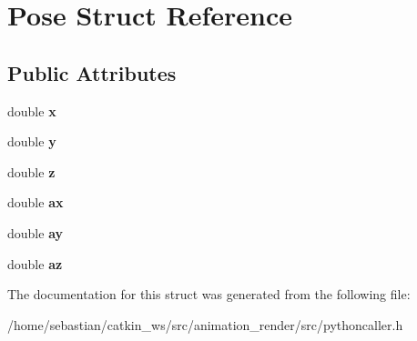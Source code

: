 \hypertarget{structPose}{}\section{Pose Struct Reference}
\label{structPose}
\subsection*{Public Attributes}
\begin{DoxyCompactItemize}
\item 
double {\bfseries x}\hypertarget{structPose_a0061c7789df90f593ab95118cbef387f}{}\label{structPose_a0061c7789df90f593ab95118cbef387f}

\item 
double {\bfseries y}\hypertarget{structPose_a6280216efe0840a7a55f025ad04e3b3d}{}\label{structPose_a6280216efe0840a7a55f025ad04e3b3d}

\item 
double {\bfseries z}\hypertarget{structPose_ad92c1d2873955b2bed6b29ac984858c3}{}\label{structPose_ad92c1d2873955b2bed6b29ac984858c3}

\item 
double {\bfseries ax}\hypertarget{structPose_a1ea6c02833ae2ecdca4d11e9379138e6}{}\label{structPose_a1ea6c02833ae2ecdca4d11e9379138e6}

\item 
double {\bfseries ay}\hypertarget{structPose_a6e7e21014c615126b38e08657d350063}{}\label{structPose_a6e7e21014c615126b38e08657d350063}

\item 
double {\bfseries az}\hypertarget{structPose_a0ae7c9f223b181c09da2f07cae7842c3}{}\label{structPose_a0ae7c9f223b181c09da2f07cae7842c3}

\end{DoxyCompactItemize}


The documentation for this struct was generated from the following file\+:\begin{DoxyCompactItemize}
\item 
/home/sebastian/catkin\+\_\+ws/src/animation\+\_\+render/src/pythoncaller.\+h\end{DoxyCompactItemize}
